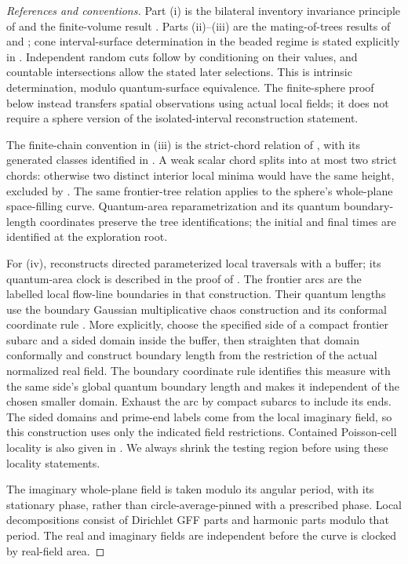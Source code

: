 \begin{proof}[References and conventions]
Part (i) is the bilateral inventory invariance principle of \cite{SheffieldInventory} and the finite-volume result \cite[Theorem~1.8]{GwynneSunFinite}. Parts (ii)--(iii) are the mating-of-trees results of \cite{DMS} and \cite[Theorem~1.1]{MillerSheffieldSphere}; cone interval-surface determination in the beaded regime is stated explicitly in \cite[Lemma~3.13]{GwynneHoldenSunBipolar}. Independent random cuts follow by conditioning on their values, and countable intersections allow the stated later selections. This is intrinsic determination, modulo quantum-surface equivalence. The finite-sphere proof below instead transfers spatial observations using actual local fields; it does not require a sphere version of the isolated-interval reconstruction statement.

The finite-chain convention in (iii) is the strict-chord relation of \cite[Lemma~8.9]{DMS}, with its generated classes identified in \cite[Lemmas~8.14--8.15]{DMS}. A weak scalar chord splits into at most two strict chords: otherwise two distinct interior local minima would have the same height, excluded by . The same frontier-tree relation applies to the sphere's whole-plane space-filling curve. Quantum-area reparametrization and its quantum boundary-length coordinates preserve the tree identifications; the initial and final times are identified at the exploration root.

For (iv), \cite[Lemma~2.4]{GwynneMillerSheffieldHarmonic} reconstructs directed parameterized local traversals with a buffer; its quantum-area clock is described in the proof of \cite[Lemma~4.3]{GwynneMillerSheffieldHarmonic}. The frontier arcs are the labelled local flow-line boundaries in that construction. Their quantum lengths use the boundary Gaussian multiplicative chaos construction and its conformal coordinate rule \cite[Sections~1.2 and~5.1]{SheffieldQuantumZipper}. More explicitly, choose the specified side of a compact frontier subarc and a sided domain inside the buffer, then straighten that domain conformally and construct boundary length from the restriction of the actual normalized real field. The boundary coordinate rule identifies this measure with the same side's global quantum boundary length and makes it independent of the chosen smaller domain. Exhaust the arc by compact subarcs to include its ends. The sided domains and prime-end labels come from the local imaginary field, so this construction uses only the indicated field restrictions. Contained Poisson-cell locality is also given in \cite[Lemma~3.7]{ContrerasHipGwynneCurvature}. We always shrink the testing region before using these locality statements.

The imaginary whole-plane field is taken modulo its angular period, with its stationary phase, rather than circle-average-pinned with a prescribed phase. Local decompositions consist of Dirichlet GFF parts and harmonic parts modulo that period. The real and imaginary fields are independent before the curve is clocked by real-field area.
\end{proof}

